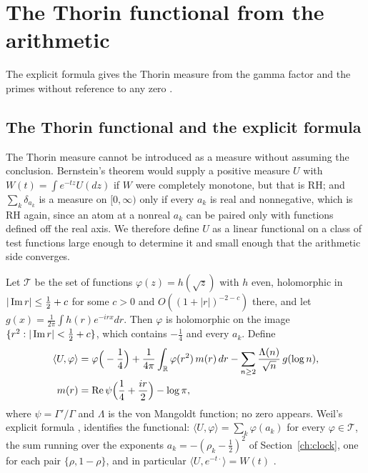 \section{The Thorin functional from the arithmetic}\label{ch:arith}

The explicit formula gives the Thorin measure from the gamma factor and the primes without reference to any zero \cite[Chapter 7]{P26}.

\subsection{The Thorin functional and the explicit formula}\label{sec:ch14:functional}

The Thorin measure cannot be introduced as a measure without assuming the conclusion. Bernstein's theorem would supply a positive measure $U$ with $W(t)=\int e^{-tz}U(dz)$ if $W$ were completely monotone, but that is RH; and $\sum_k\delta_{a_k}$ is a measure on $[0,\infty)$ only if every $a_k$ is real and nonnegative, which is RH again, since an atom at a nonreal $a_k$ can be paired only with functions defined off the real axis. We therefore define $U$ as a linear functional on a class of test functions large enough to determine it and small enough that the arithmetic side converges.

Let $\mathcal T$ be the set of functions $\varphi(z)=h(\sqrt z)$ with $h$ even, holomorphic in $|\operatorname{Im} r|\le\frac12+c$ for some $c>0$ and $O((1+|r|)^{-2-c})$ there, and let $g(x)=\frac1{2\pi}\int h(r)e^{-irx}dr$. Then $\varphi$ is holomorphic on the image $\{r^2:|\operatorname{Im} r|<\frac12+c\}$, which contains $-\frac14$ and every $a_k$. Define
\begin{equation}\label{eq:ch14:U}
\begin{aligned}
\langle U,\varphi\rangle&=\varphi\Big(-\frac14\Big)+\frac1{4\pi}\int_{\mathbb R}\varphi(r^2)\,m(r)\,dr-\sum_{n\ge2}\frac{\Lambda(n)}{\sqrt n}\,g(\log n),\\
m(r)&=\operatorname{Re}\psi\Big(\frac14+\frac{ir}2\Big)-\log\pi ,
\end{aligned}
\end{equation}
where $\psi=\Gamma'/\Gamma$ and $\Lambda$ is the von Mangoldt function; no zero appears. Weil's explicit formula \cite{Weil52}, \cite[Theorem 5.12]{IwaniecKowalski04} identifies the functional: $\langle U,\varphi\rangle=\sum_k\varphi(a_k)$ for every $\varphi\in\mathcal T$, the sum running over the exponents $a_k=-(\rho_k-\frac12)^2$ of Section~\ref{ch:clock}, one for each pair $\{\rho,1-\rho\}$, and in particular $\langle U,e^{-t\cdot}\rangle=W(t)$ \cite[Proposition 9.4]{P17}.

